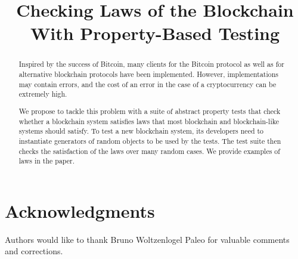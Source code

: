 \documentclass[conference]{IEEEtran}   %
\begin{document}
\title{Checking Laws of the Blockchain With Property-Based Testing}
\author{
}

\maketitle

\begin{abstract}
Inspired by the success of Bitcoin, many clients for the Bitcoin protocol as well as for alternative blockchain protocols have been implemented. However, implementations may contain errors, and the cost of an error in the case of a cryptocurrency can be extremely high. 

We propose to tackle this problem with a suite of abstract property tests that check whether a blockchain system satisfies laws that most blockchain and blockchain-like systems should satisfy. To test a new blockchain system, its developers need to instantiate generators of random objects to be used by the tests. The test suite then checks the satisfaction of the laws over many random cases. We provide examples of laws in the paper.
\end{abstract}












\section*{Acknowledgments}

Authors would like to thank Bruno Woltzenlogel Paleo for valuable comments and corrections.





%
\end{document}
